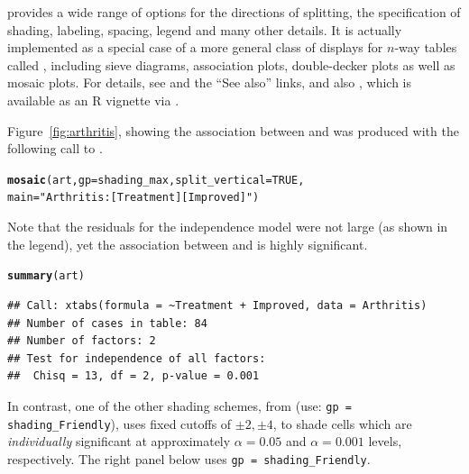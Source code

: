 \documentclass[10pt,twoside]{article}\usepackage[]{graphicx}\usepackage[]{color}
\makeatletter
\newcommand{\hlnum}[1]{\textcolor[rgb]{0.686,0.059,0.569}{#1}}%
\newcommand{\hlstr}[1]{\textcolor[rgb]{0.192,0.494,0.8}{#1}}%
\newcommand{\hlstd}[1]{\textcolor[rgb]{0.345,0.345,0.345}{#1}}%
\newcommand{\hlkwc}[1]{\textcolor[rgb]{0.333,0.667,0.333}{#1}}%
\newcommand{\hlkwd}[1]{\textcolor[rgb]{0.737,0.353,0.396}{\textbf{#1}}}%
\newenvironment{kframe}{%
 \def\at@end@of@kframe{}%
 \ifinner\ifhmode%
  \def\at@end@of@kframe{\end{minipage}}%
  \begin{minipage}{\columnwidth}%
 \fi\fi%
 \def\FrameCommand##1{\hskip\@totalleftmargin \hskip-\fboxsep
 \colorbox{shadecolor}{##1}\hskip-\fboxsep
     \hskip-\linewidth \hskip-\@totalleftmargin \hskip\columnwidth}%
 \MakeFramed {\advance\hsize-\width
   \@totalleftmargin\z@ \linewidth\hsize
   \@setminipage}}%
 {\par\unskip\endMakeFramed%
 \at@end@of@kframe}
\newenvironment{knitrout}{}{} %
\newcommand{\figref}[1]{Figure~\ref{#1}}
\newcommand{\codefun}[1]{\code{#1()}}
\let\proglang=\textsf
\makeatother
\begin{document}
\codefun{mosaic} provides a wide range of options for the directions of splitting,
the specification of shading, labeling, spacing, legend and many other details.
It is actually implemented as a special case of a more general
class of displays for $n$-way tables called , including
sieve diagrams, association plots, double-decker plots as well as mosaic
plots.  For details, see  and the ``See also'' links,
and also \citet{vcd:Meyer+Zeileis+Hornik:2006b}, which is available as
an \proglang{R} vignette via .

\figref{fig:arthritis}, showing the association between
 and  was produced with the following
call to \codefun{mosaic}.
\begin{knitrout}
\color{fgcolor}\begin{kframe}
\begin{alltt}
\hlkwd{mosaic}\hlstd{(art,} \hlkwc{gp} \hlstd{= shading_max,} \hlkwc{split_vertical} \hlstd{=} \hlnum{TRUE}\hlstd{,}
       \hlkwc{main}\hlstd{=}\hlstr{"Arthritis: [Treatment] [Improved]"}\hlstd{)}
\end{alltt}
\end{kframe}
\end{knitrout}

Note that the residuals for the independence model were not large
(as shown in the legend),
yet the association between  and 
is highly significant.
\begin{knitrout}
\color{fgcolor}\begin{kframe}
\begin{alltt}
\hlkwd{summary}\hlstd{(art)}
\end{alltt}
\begin{verbatim}
## Call: xtabs(formula = ~Treatment + Improved, data = Arthritis)
## Number of cases in table: 84 
## Number of factors: 2 
## Test for independence of all factors:
## 	Chisq = 13, df = 2, p-value = 0.001
\end{verbatim}
\end{kframe}
\end{knitrout}

In contrast, one of the other shading schemes, from \citet{vcd:Friendly:1994}
(use: \verb|gp = shading_Friendly|), 
uses fixed cutoffs of $\pm 2, \pm 4$,
to shade cells which are \emph{individually} significant
at approximately $\alpha = 0.05$ and $\alpha = 0.001$ levels, respectively.
The right panel below uses \verb|gp = shading_Friendly|.
\end{document}
